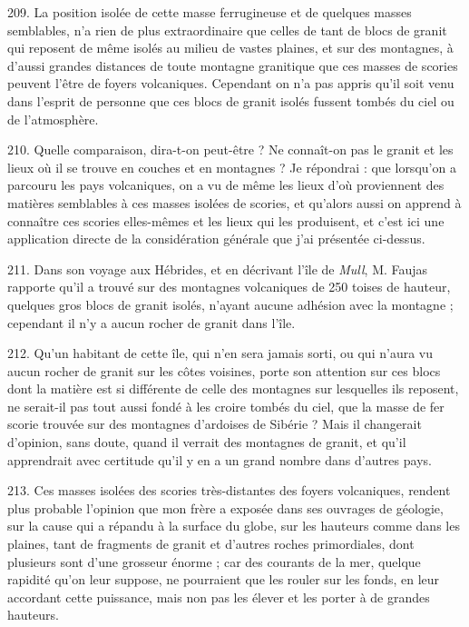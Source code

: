 \documentclass[a4paper, 11pt, oneside, polutonikogreek, french]{article}
\begin{document}
209. La position isolée de cette masse ferrugineuse et de quelques masses semblables, n'a rien de plus extraordinaire que celles de tant de blocs de granit qui reposent de même isolés au milieu de vastes plaines, et sur des montagnes, à d'aussi grandes distances de toute montagne granitique que ces masses de scories peuvent l'être de foyers volcaniques. Cependant on n'a pas appris qu'il soit venu dans l'esprit de personne que ces blocs de granit isolés fussent tombés du ciel ou de l'atmosphère.

210. Quelle comparaison, dira-t-on peut-être ? Ne connaît-on pas le granit et les lieux où il se trouve en couches et en montagnes ? Je répondrai : que lorsqu'on a parcouru les pays volcaniques, on a vu de même les lieux d'où proviennent des matières semblables à ces masses isolées de scories, et qu'alors aussi on apprend à connaître ces scories elles-mêmes et les lieux qui les produisent, et c'est ici une application directe de la considération générale que j'ai présentée ci-dessus.

211. Dans son voyage aux Hébrides, et en décrivant l'île de \emph{Mull}, M. Faujas rapporte qu'il a trouvé sur des montagnes volcaniques de 250 toises de hauteur, quelques gros blocs de granit isolés, n'ayant aucune adhésion avec la montagne ; cependant il n'y a aucun rocher de granit dans l'île.

212. Qu'un habitant de cette île, qui n'en sera jamais sorti, ou qui n'aura vu aucun rocher de granit sur les côtes voisines, porte son attention sur ces blocs dont la matière est si différente de celle des montagnes sur lesquelles ils reposent, ne serait-il pas tout aussi fondé à les croire tombés du ciel, que la masse de fer scorie trouvée sur des montagnes d'ardoises de Sibérie ? Mais il changerait d'opinion, sans doute, quand il verrait des montagnes de granit, et qu'il apprendrait avec certitude qu'il y en a un grand nombre dans d'autres pays.

213. Ces masses isolées des scories très-distantes des foyers volcaniques, rendent plus probable l'opinion que mon frère a exposée dans ses ouvrages de géologie, sur la cause qui a répandu à la surface du globe, sur les hauteurs comme dans les plaines, tant de fragments de granit et d'autres roches primordiales, dont plusieurs sont d'une grosseur énorme ; car des courants de la mer, quelque rapidité qu'on leur suppose, ne pourraient que les rouler sur les fonds, en leur accordant cette puissance, mais non pas les élever et les porter à de grandes hauteurs.
\end{document}

